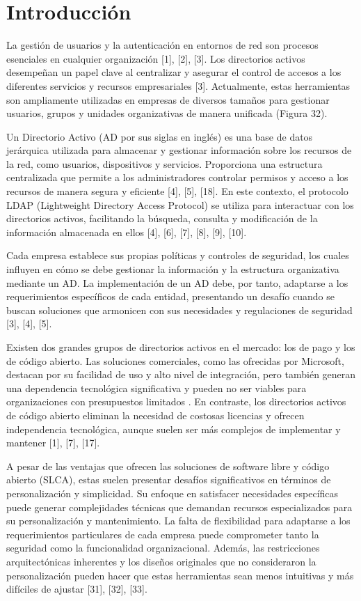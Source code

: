 \section*{Introducción}

La gestión de usuarios y la autenticación en entornos de red son procesos esenciales en cualquier organización [1], [2], [3]. Los directorios activos desempeñan un papel clave al centralizar y asegurar el control de accesos a los diferentes servicios y recursos empresariales [3]. Actualmente, estas herramientas son ampliamente utilizadas en empresas de diversos tamaños para gestionar usuarios, grupos y unidades organizativas de manera unificada (Figura 32).

Un Directorio Activo (AD por sus siglas en inglés) es una base de datos jerárquica utilizada para almacenar y gestionar información sobre los recursos de la red, como usuarios, dispositivos y servicios. Proporciona una estructura centralizada que permite a los administradores controlar permisos y acceso a los recursos de manera segura y eficiente  [4], [5], [18]. En este contexto, el protocolo LDAP (Lightweight Directory Access Protocol) se utiliza para interactuar con los directorios activos, facilitando la búsqueda, consulta y modificación de la información almacenada en ellos [4], [6], [7], [8], [9], [10].

Cada empresa establece sus propias políticas y controles de seguridad, los cuales influyen en cómo se debe gestionar la información y la estructura organizativa mediante un AD. La implementación de un AD debe, por tanto, adaptarse a los requerimientos específicos de cada entidad, presentando un desafío cuando se buscan soluciones que armonicen con sus necesidades y regulaciones de seguridad [3], [4], [5].

Existen dos grandes grupos de directorios activos en el mercado: los de pago y los de código abierto. Las soluciones comerciales, como las ofrecidas por Microsoft, destacan por su facilidad de uso y alto nivel de integración, pero también generan una dependencia tecnológica significativa y pueden no ser viables para organizaciones con presupuestos limitados . En contraste, los directorios activos de código abierto eliminan la necesidad de costosas licencias y ofrecen independencia tecnológica, aunque suelen ser más complejos de implementar y mantener [1], [7], [17].

A pesar de las ventajas que ofrecen las soluciones de software libre y código abierto (SLCA), estas suelen presentar desafíos significativos en términos de personalización y simplicidad. Su enfoque en satisfacer necesidades específicas puede generar complejidades técnicas que demandan recursos especializados para su personalización y mantenimiento. La falta de flexibilidad para adaptarse a los requerimientos particulares de cada empresa puede comprometer tanto la seguridad como la funcionalidad organizacional. Además, las restricciones arquitectónicas inherentes y los diseños originales que no consideraron la personalización pueden hacer que estas herramientas sean menos intuitivas y más difíciles de ajustar [31], [32], [33].

